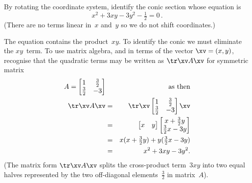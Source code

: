 \begin{example} \label{eg:}
By rotating the coordinate system, identify the conic section whose equation is
\begin{equation*}
x^2+3xy-3y^2-\tfrac12=0\,.
\end{equation*}
(There are no terms linear in~\(x\) and~\(y\) so we do not shift coordinates.)
\begin{solution} 
The equation contains the product~\(xy\).
To identify the conic we must eliminate the \(xy\)~term.
To use matrix algebra, and in terms of the vector \(\xv=(x,y)\), recognise that the quadratic terms may be written as \(\tr\xv A\xv\) for symmetric matrix
\begin{eqnarray*}
A=\begin{bmatrix} 1&\frac32\\\frac32&-3 \end{bmatrix}
&&\text{as then}
\\\tr\xv A\xv
&=&\tr\xv\begin{bmatrix} 1&\frac32\\\frac32&-3 \end{bmatrix}\xv
\\&=&\begin{bmatrix} x&y \end{bmatrix}\begin{bmatrix} x+\frac32y\\\frac32x-3y \end{bmatrix}
\\&=&x(x+\tfrac32y)+y(\tfrac32x-3y)
\\&=&x^2+3xy-3y^2.
\end{eqnarray*}
(The matrix form \(\tr\xv A\xv\) splits the cross-product term~\(3xy\) into two equal halves represented by the two off-diagonal elements~\(\tfrac32\) in matrix~\(A\)).
\def\temp#1{\begin{tikzpicture}
  \begin{axis}[footnotesize,font=\footnotesize ,axis equal image
  , xlabel={$x$}, ylabel={$y$}, axis lines=middle
  , xtick={-1,1,2}, ytick={-2,-1,1,2}  ]
  \addplot[brown,quiver={u=1,v=-3},-stealth] coordinates {(-1/3,3/3)};
  \node[brown,right] at (axis cs:0.566,-1.7) {$x'$};
  \addplot[brown,quiver={u=0.316,v=-0.949},-stealth,thick] coordinates {(0,0)};
  \node[brown,right] at (axis cs:0.316,-0.949) {$\vec v_1$};
  \addplot[brown,quiver={u=3,v=1},-stealth] coordinates {(-3/3,-1/3)};
  \node[brown,above] at (axis cs:1.7,0.566) {$y'$};
  \addplot[brown,quiver={u=0.949,v=0.316},-stealth,thick] coordinates {(0,0)};

\end{axis}
\end{tikzpicture}}
\end{solution}
\end{example}
